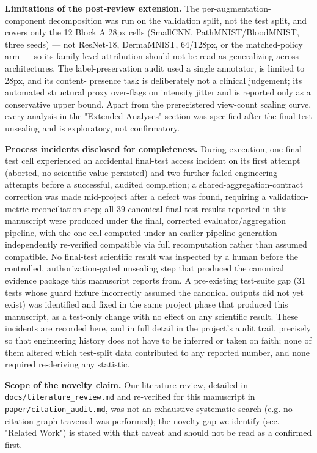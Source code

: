 \textbf{Limitations of the post-review extension.} The per-augmentation- component decomposition was run on the validation split, not the test split, and covers only the 12 Block A 28px cells (SmallCNN, PathMNIST/BloodMNIST, three seeds) --- not ResNet-18, DermaMNIST, 64/128px, or the matched-policy arm --- so its family-level attribution should not be read as generalizing across architectures. The label-preservation audit used a single annotator, is limited to 28px, and its content- presence task is deliberately not a clinical judgement; its automated structural proxy over-flags on intensity jitter and is reported only as a conservative upper bound. Apart from the preregistered view-count scaling curve, every analysis in the "Extended Analyses" section was specified after the final-test unsealing and is exploratory, not confirmatory.

\textbf{Process incidents disclosed for completeness.} During execution, one final-test cell experienced an accidental final-test access incident on its first attempt (aborted, no scientific value persisted) and two further failed engineering attempts before a successful, audited completion; a shared-aggregation-contract correction was made mid-project after a defect was found, requiring a validation-metric-reconciliation step; all 39 canonical final-test results reported in this manuscript were produced under the final, corrected evaluator/aggregation pipeline, with the one cell computed under an earlier pipeline generation independently re-verified compatible via full recomputation rather than assumed compatible. No final-test scientific result was inspected by a human before the controlled, authorization-gated unsealing step that produced the canonical evidence package this manuscript reports from. A pre-existing test-suite gap (31 tests whose guard fixture incorrectly assumed the canonical outputs did not yet exist) was identified and fixed in the same project phase that produced this manuscript, as a test-only change with no effect on any scientific result. These incidents are recorded here, and in full detail in the project's audit trail, precisely so that engineering history does not have to be inferred or taken on faith; none of them altered which test-split data contributed to any reported number, and none required re-deriving any statistic.

\textbf{Scope of the novelty claim.} Our literature review, detailed in \texttt{docs/\allowbreak literature\_\allowbreak review.md} and re-verified for this manuscript in \texttt{paper/\allowbreak citation\_\allowbreak audit.md}, was not an exhaustive systematic search (e.g. no citation-graph traversal was performed); the novelty gap we identify (sec. "Related Work") is stated with that caveat and should not be read as a confirmed first.

